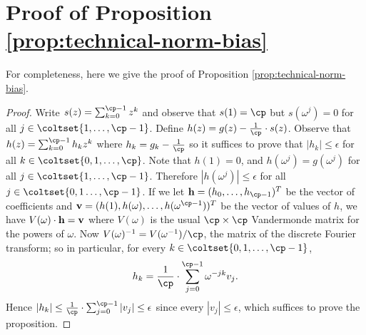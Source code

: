 \section{Proof of Proposition \ref{prop:technical-norm-bias}}
\label{sec:bias-balance}

For completeness, here we give the proof of Proposition \ref{prop:technical-norm-bias}.
\medskip
\begin{proof}
Write $s(z)=\sum_{k=0}^{\cp-1} z^k$ and observe that $s(1)=\cp$ but
$s(\omega^j)=0$ for all $j\in \coltset{1,\ldots,\cp-1}$.
Define $h(z)=g(z)-\frac{1}\cp \cdot s(z)$.
Observe that
$h(z)=\sum_{k=0}^{\cp-1} h_k z^k$ where $h_k =g_k -\frac{1}\cp$ so it
suffices to prove that $|h_k|\le \epsilon$ for all $k\in \coltset{0,1,\ldots,\cp}$.
Note that $h(1)=0$, and $h(\omega^j)=g(\omega^j)$ for all
$j\in \coltset{1,\ldots,\cp-1}$. Therefore $|h(\omega^j)|\le \epsilon$ for all
$j\in \coltset{0,1\ldots, \cp-1}$.
If we let $\mathbf{h}=(h_0,\ldots,h_{\cp-1})^T$ be the vector of coefficients and 
$\mathbf{v}=(h(1),h(\omega),\ldots,h(\omega^{\cp-1}))^T$ be the vector of values
of $h$, we have $V(\omega)\cdot \bf{h}=\bf{v}$ where $V(\omega)$ is the usual
$\cp\times\cp$ Vandermonde matrix for the powers of $\omega$. 
Now $V(\omega)^{-1}=V(\omega^{-1})/\cp$, the matrix of the
discrete Fourier transform;
so in particular, for every $k\in \coltset{0,1,\ldots, \cp-1}$,
$$h_k=\frac{1}{\cp}\cdot \sum_{j=0}^{\cp-1} \omega^{-jk} v_j.$$
Hence $|h_k|\le \frac{1}{\cp} \cdot \sum_{j=0}^{\cp-1} |v_j|\le \epsilon$
since every $|v_j|\le \epsilon$, which suffices to prove the proposition.
\end{proof}